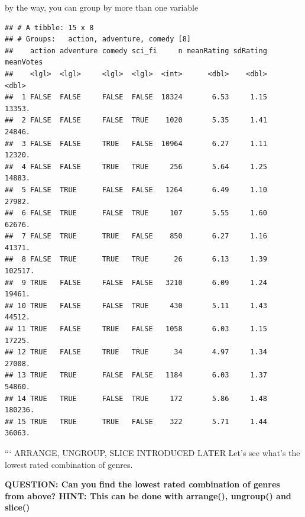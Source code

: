 \documentclass[]{book}
\newenvironment{Shaded}{\begin{snugshade}}{\end{snugshade}}
\newcommand{\DataTypeTok}[1]{\textcolor[rgb]{0.13,0.29,0.53}{#1}}
\newcommand{\KeywordTok}[1]{\textcolor[rgb]{0.13,0.29,0.53}{\textbf{#1}}}
\newcommand{\NormalTok}[1]{#1}
\newcommand{\OperatorTok}[1]{\textcolor[rgb]{0.81,0.36,0.00}{\textbf{#1}}}
\newcommand{\StringTok}[1]{\textcolor[rgb]{0.31,0.60,0.02}{#1}}
\begin{document}
by the way, you can group by more than one variable

\begin{Shaded}
\end{Shaded}

\begin{verbatim}
## # A tibble: 15 x 8
## # Groups:   action, adventure, comedy [8]
##    action adventure comedy sci_fi     n meanRating sdRating meanVotes
##    <lgl>  <lgl>     <lgl>  <lgl>  <int>      <dbl>    <dbl>     <dbl>
##  1 FALSE  FALSE     FALSE  FALSE  18324       6.53     1.15    13353.
##  2 FALSE  FALSE     FALSE  TRUE    1020       5.35     1.41    24846.
##  3 FALSE  FALSE     TRUE   FALSE  10964       6.27     1.11    12320.
##  4 FALSE  FALSE     TRUE   TRUE     256       5.64     1.25    14883.
##  5 FALSE  TRUE      FALSE  FALSE   1264       6.49     1.10    27982.
##  6 FALSE  TRUE      FALSE  TRUE     107       5.55     1.60    62676.
##  7 FALSE  TRUE      TRUE   FALSE    850       6.27     1.16    41371.
##  8 FALSE  TRUE      TRUE   TRUE      26       6.13     1.39   102517.
##  9 TRUE   FALSE     FALSE  FALSE   3210       6.09     1.24    19461.
## 10 TRUE   FALSE     FALSE  TRUE     430       5.11     1.43    44512.
## 11 TRUE   FALSE     TRUE   FALSE   1058       6.03     1.15    17225.
## 12 TRUE   FALSE     TRUE   TRUE      34       4.97     1.34    27008.
## 13 TRUE   TRUE      FALSE  FALSE   1184       6.03     1.37    54860.
## 14 TRUE   TRUE      FALSE  TRUE     172       5.86     1.48   180236.
## 15 TRUE   TRUE      TRUE   FALSE    322       5.71     1.44    36063.
\end{verbatim}

```
ARRANGE, UNGROUP, SLICE INTRODUCED LATER
Let's see what's the lowest rated combination of genres.

\textbf{QUESTION: Can you find the lowest rated combination of genres from above? HINT: This can be done with arrange(), ungroup() and slice()}
\end{document}
